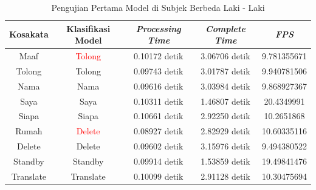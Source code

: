 \begin{longtable}{|c|c|c|c|c|}
  \caption{Pengujian Pertama Model di Subjek Berbeda Laki - Laki}
  \label{tb:prediksilaki1}                                   \\
  \hline
  \rowcolor[HTML]{C0C0C0}
  \textbf{Kosakata} & \textbf{Klasifikasi Model} & \textbf{\emph{Processing Time}} & \textbf{\emph{Complete Time}} & \textbf{\emph{FPS}}\\
  \hline
  Maaf              & \textcolor{red}{Tolong}       & 0.10172 detik                           & 3.06706 detik                                  & 9.781355671\\
  Tolong            & Tolong                        & 0.09743 detik                           & 3.01787 detik                                  & 9.940781506\\
  Nama              & Nama                          & 0.09616 detik                           & 3.03984 detik                                  & 9.868927367\\
  Saya              & Saya                          & 0.10311 detik                           & 1.46807 detik                                  & 20.4349991\\
  Siapa             & Siapa                         & 0.10661 detik                           & 2.92250 detik                                  & 10.2651868\\
  Rumah             & \textcolor{red}{Delete}       & 0.08927 detik                           & 2.82929 detik                                  & 10.60335116\\
  Delete            & Delete                        & 0.09602 detik                           & 3.15976 detik                                  & 9.494380522\\
  Standby           & Standby                       & 0.09914 detik                           & 1.53859 detik                                  & 19.49841476\\
  Translate         & Translate                     & 0.10099 detik                           & 2.91128 detik                                  & 10.30475694\\
  \hline
\end{longtable}


